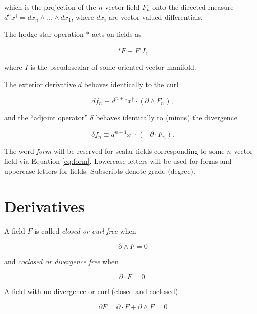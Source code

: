 \documentclass{article}
\begin{document}
which is the projection of the $n$-vector field $F_n$ onto the directed measure $d^nx^\dagger = dx_n \wedge \dots \wedge dx_1$, where $dx_i$ are vector valued differentials. 

The hodge star operation $*$ acts on fields as

\begin{equation}
  *F \equiv F^\dagger I,\label{eq:hodge}
\end{equation}

where $I$ is the pseudoscalar of some oriented vector manifold.

The exterior derivative $d$ behaves identically to the curl

\begin{equation}
  d f_n \equiv d^{n+1}x^\dagger \cdot (\partial \wedge F_n),\label{eq:curl}
\end{equation}

and the ``adjoint operator'' $\delta$ behaves identically to (minus) the divergence

\begin{equation}
  \delta f_n \equiv d^{n-1}x^\dagger \cdot (-\partial \cdot F_n).\label{eq:divergence}
\end{equation} 

The word \emph{form} will be reserved for scalar fields corresponding to some $n$-vector field via Equation \ref{eq:form}. Lowercase letters will be used for forms and uppercase letters for fields. Subscripts denote grade (degree).

\section{Derivatives}

A field $F$ is called \emph{closed or curl free} when 

\begin{equation}
  \partial \wedge F = 0
\end{equation}

and \emph{coclosed or divergence free} when 

\begin{equation}
  \partial \cdot F = 0.
\end{equation}

A field with no divergence or curl (closed and coclosed)

\begin{equation}
  \partial F = \partial \cdot F + \partial \wedge F = 0
\end{equation}
\end{document}

